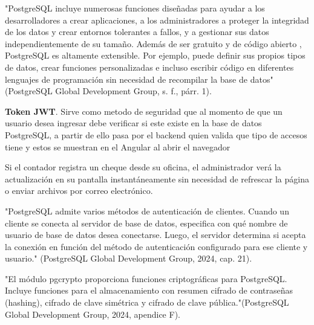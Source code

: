"PostgreSQL incluye numerosas funciones diseñadas para ayudar a los desarrolladores a crear aplicaciones, a los administradores a proteger la integridad de los datos y crear entornos tolerantes a fallos, y a gestionar sus datos independientemente de su tamaño. Además de ser gratuito y de código abierto , PostgreSQL es altamente extensible. Por ejemplo, puede definir sus propios tipos de datos, crear funciones personalizadas e incluso escribir código en diferentes lenguajes de programación sin necesidad de recompilar la base de datos" (PostgreSQL Global Development Group, s. f., párr. 1).

\textbf{Token JWT}. Sirve como metodo de seguridad que al momento de que un usuario desea ingresar debe verificar si este existe en la base de datos PostgreSQL, a partir de ello pasa por el backend quien valida que tipo de accesos tiene y estos se muestran en el Angular al abrir el navegador

Si el contador registra un cheque desde su oficina, el administrador verá la actualización en su pantalla instantáneamente sin necesidad de refrescar la página o enviar archivos por correo electrónico.

"PostgreSQL admite varios métodos de autenticación de clientes. Cuando un cliente se conecta al servidor de base de datos, especifica con qué nombre de usuario de base de datos desea conectarse. Luego, el servidor determina si acepta la conexión en función del método de autenticación configurado para ese cliente y usuario." (PostgreSQL Global Development Group, 2024, cap. 21).

"El módulo pgcrypto proporciona funciones criptográficas para PostgreSQL. Incluye funciones para el almacenamiento con resumen cifrado de contraseñas (hashing), cifrado de clave simétrica y cifrado de clave pública."(PostgreSQL Global Development Group, 2024, apendice F).

